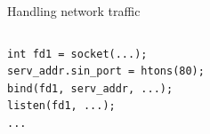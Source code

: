 \documentclass{beamer}
\begin{document}
\begin{frame}[fragile]{Handling network traffic}
\begin{columns}
\begin{column}[t]{0.5\textwidth}
\begin{verbatim}
int fd1 = socket(...);
serv_addr.sin_port = htons(80);
bind(fd1, serv_addr, ...);
listen(fd1, ...);
...
\end{verbatim}
\end{column}
\begin{column}[t]{0.5\textwidth}  %
    \begin{center}
\end{center}
\end{column}
\end{columns}
\end{frame}
\end{document}
